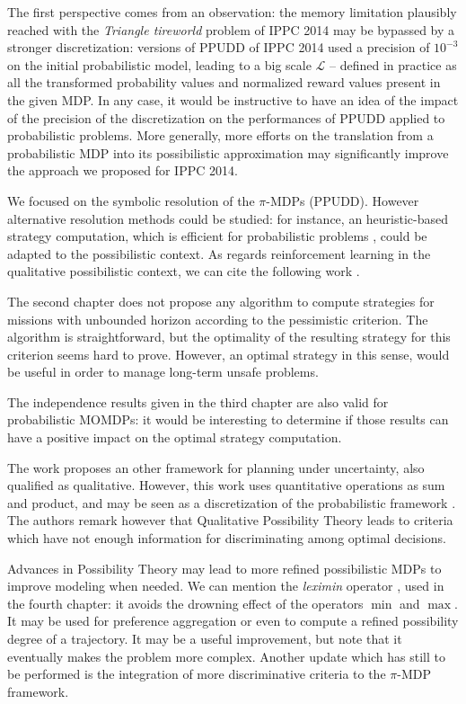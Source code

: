 The first perspective comes from an observation:
the memory limitation plausibly reached with the \textit{Triangle tireworld} 
problem of IPPC 2014 may be bypassed by a stronger discretization: 
versions of PPUDD of IPPC 2014 used a precision of $10^{-3}$
on the initial probabilistic model, leading to a big scale $\mathcal{L}$
-- defined in practice as all the transformed probability values and normalized reward	 values
present in the given MDP.
In any case, it would be instructive to have an idea
of the impact of the precision of the discretization
on the performances of PPUDD applied to probabilistic problems. 
More generally, more efforts 
on the translation 
from a probabilistic MDP into 
its possibilistic approximation
may significantly improve 
the approach we proposed for IPPC 2014.

We focused on the symbolic resolution of the $\pi$-MDPs (PPUDD).
However alternative resolution methods could be studied:
for instance, an heuristic-based strategy computation, 
which is efficient for probabilistic problems \cite{DBLP:conf/aaai/Teichteil-KonigsbuchVI11},
could be adapted to the possibilistic context.
As regards reinforcement learning 
in the qualitative possibilistic context,
we can cite the following work \cite{DBLP:conf/fuzzIEEE/Sabbadin01}.

The second chapter does not propose any algorithm
to compute strategies 
for missions with unbounded horizon
according to the pessimistic criterion. 
The algorithm is straightforward, 
but the optimality of the resulting strategy 
for this criterion
seems hard to prove.
However, an optimal strategy 
in this sense,
would be useful
in order to manage 
long-term unsafe problems. 

The independence results given in the third chapter
are also valid for probabilistic MOMDPs: 
it would be interesting to determine if those results can have
a positive impact on the optimal strategy computation.

The work \cite{Bonet:2002:QMP:2073876.2073884} proposes an other framework
for planning under uncertainty, also qualified as qualitative. 
However, this work uses quantitative operations
as sum and product, and may be seen as a discretization of the probabilistic framework \cite{Wilson:1995:OMC:2074158.2074221}.
The authors remark however that Qualitative Possibility Theory leads to 
criteria which have not enough information for discriminating
among optimal decisions.

Advances in Possibility Theory
may lead to more refined possibilistic MDPs
to improve modeling when needed.
We can mention the \textit{leximin} operator \cite{lexirefin},
used in the fourth chapter:
it avoids the drowning effect
of the operators $\min$ and $\max$.
It may be used for preference aggregation
or even to compute a refined possibility degree 
of a trajectory. 
It may be a useful improvement,
but note that it eventually makes 
the problem more complex.
Another update which has still to be performed
is the integration 
of more discriminative criteria 
\cite{LIP61723,conf/uai/GiangS01} 
to the $\pi$-MDP framework.

